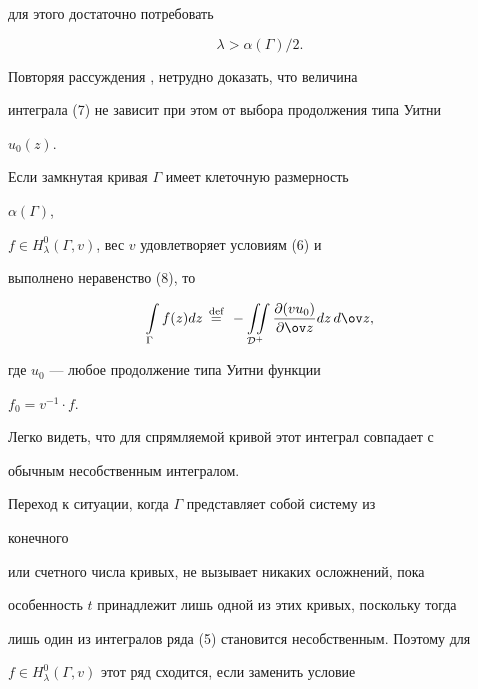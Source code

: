 \cite{15} для этого достаточно потребовать


\begin{equation}


\lambda>\alpha(\Gamma)/2.


\end{equation}


Повторяя рассуждения \cite{15}, нетрудно доказать, что величина


интеграла (7) не зависит при этом от выбора продолжения типа Уитни


$u_0(z)$.





\begin{defn}


Если замкнутая кривая $\Gamma$ имеет клеточную размерность


$\alpha(\Gamma)$,


$f\in H^0_\lambda(\Gamma,v)$, вес $v$ удовлетворяет условиям (6) и


выполнено неравенство (8), то


$$


\int\limits_\Gamma f(z)dz\,\overset{\text{def}}{=}{}\,


-\iint\limits_{\cal D^+}\frac{\partial(vu_0)}{\partial\ov z}


dz\,d\ov z,


$$


где $u_0$ --- любое продолжение типа Уитни функции


$f_0=v^{-1}\cdot f$.


\end{defn}





Легко видеть, что для спрямляемой кривой этот интеграл совпадает с


обычным несобственным интегралом.





Переход к ситуации, когда $\Gamma$ представляет собой систему из


конечного


или счетного числа кривых, не вызывает никаких осложнений, пока


особенность $t$ принадлежит лишь одной из этих кривых, поскольку тогда


лишь один из интегралов ряда (5) становится несобственным. Поэтому для


$f\in H^0_\lambda(\Gamma,v)$ этот ряд сходится, если заменить условие


